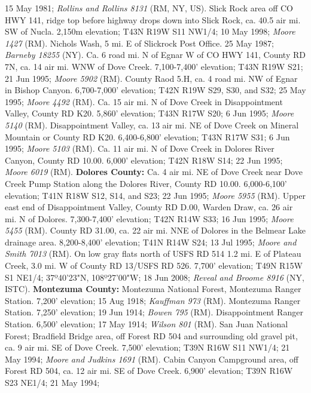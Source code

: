 15 May 1981; \textit{Rollins and Rollins 8131} (RM, NY, US).
Slick Rock area off CO HWY 141, ridge top before highway drops down into
Slick Rock, ca. 40.5 air mi. SW of Nucla. 2,150m elevation; T43N R19W S11 NW1/4;
10 May 1998; \textit{Moore 1427} (RM).
Nichols Wash, 5 mi. E of Slickrock Post Office. 25 May 1987;
\textit{Barneby 18255} (NY).
Ca. 6 road mi. N of Egnar W of CO HWY 141, County RD 7N, ca. 14 air mi. WNW
of Dove Creek. 7,100-7,400' elevation; T43N R19W S21; 21 Jun 1995;
\textit{Moore 5902} (RM).
County Raod 5.H, ca. 4 road mi. NW of Egnar in Bishop Canyon. 6,700-7,000'
elevation; T42N R19W S29, S30, and S32; 25 May 1995; \textit{Moore 4492} (RM).
Ca. 15 air mi. N of Dove Creek in Disappointment Valley, County RD K20.
5,860' elevation; T43N R17W S20; 6 Jun 1995; \textit{Moore 5140} (RM).
Disappointment Valley, ca. 13 air mi. NE of Dove Creek on Mineral Mountain or
County RD K20. 6,400-6,800' elevation; T43N R17W S31; 6 Jun 1995;
\textit{Moore 5103} (RM).
Ca. 11 air mi. N of Dove Creek in Dolores River Canyon, County RD 10.00.
6,000' elevation; T42N R18W S14; 22 Jun 1995; \textit{Moore 6019} (RM).
  \textbf{Dolores County:}
Ca. 4 air mi. NE of Dove Creek near Dove Creek Pump Station along the Dolores
River, County RD 10.00. 6,000-6,100' elevation; T41N R18W S12, S14, and S23;
22 Jun 1995; \textit{Moore 5955} (RM).
Upper east end of Disappointment Valley, County RD D.00, Warden Draw, ca. 26
air mi. N of Dolores. 7,300-7,400' elevation; T42N R14W S33; 16 Jun 1995;
\textit{Moore 5455} (RM).
County RD 31.00, ca. 22 air mi. NNE of Dolores in the Belmear Lake drainage
area. 8,200-8,400' elevation; T41N R14W S24; 13 Jul 1995;
\textit{Moore and Smith 7013} (RM).
On low gray flats north of USFS RD 514 1.2 mi. E of Plateau Creek, 3.0 mi. W
of County RD 13/USFS RD 526. 7,700' elevation; T49N R15W S1 NE1/4;
37º40'23"N, 108º27'00"W; 18 Jun 2008; \textit{Reveal and Broome 8916} (NY, ISTC).
  \textbf{Montezuma County:}
Montezuma National Forest, Montezuma Ranger Station. 7,200' elevation;
15 Aug 1918; \textit{Kauffman 973} (RM).
Montezuma Ranger Station. 7,250' elevation; 19 Jun 1914; \textit{Bowen 795} (RM).
Disappointment Ranger Station. 6,500' elevation; 17 May 1914;
\textit{Wilson 801} (RM).
San Juan National Forest; Bradfield Bridge area, off Forest RD 504 and
surrounding old gravel pit, ca. 9 air mi. SE of Dove Creek. 7,500' elevation;
T39N R16W S11 NW1/4; 21 May 1994; \textit{Moore and Judkins 1691} (RM).
Cabin Canyon Campground area, off Forest RD 504, ca. 12 air mi. SE of
Dove Creek. 6,900' elevation; T39N R16W S23 NE1/4; 21 May 1994;
